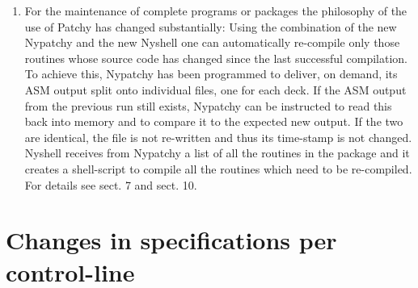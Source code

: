 \begin{enumerate}
\item
For the maintenance of complete programs or packages the philosophy of the
use of Patchy has changed substantially: Using the combination of the new
Nypatchy and the new Nyshell one can automatically re-compile only those
routines whose source code has changed since the last successful compilation.
To achieve this, Nypatchy has been programmed to deliver, on demand, its
ASM output split onto individual files, one for each deck. If the ASM output
from the previous run still exists, Nypatchy can be instructed to read this
back into memory and to compare it to the expected new output. If the two
are identical, the file is not re-written and thus its time-stamp is not
changed. Nyshell receives from Nypatchy a list of all the routines in the
package and it creates a shell-script to compile all the routines which
need to be re-compiled. For details see sect. 7 and sect. 10.
\end{enumerate}


\section{Changes in specifications per control-line}

\renewcommand{\labelenumi}{3.\theenumi)\ }


